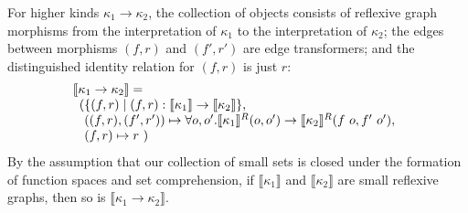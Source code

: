 \documentclass[preprint]{sigplanconf}
\newcommand{\sepbar}{\mathrel|}
\theoremstyle{examplestyle}
\newcommand{\sem}[1]{\llbracket #1 \rrbracket}
\newcommand{\semKR}[1]{\llbracket #1 \rrbracket^R}
\begin{document}
For higher kinds $\kappa_1 \to \kappa_2$, the collection of objects
consists of reflexive graph morphisms from the interpretation of
$\kappa_1$ to the interpretation of $\kappa_2$; the edges between
morphisms $(f, r)$ and $(f', r')$ are edge transformers; and the
distinguished identity relation for $(f,r)$ is just $r$:
\begin{displaymath}
  \begin{array}{@{}l}
    \sem{\kappa_1 \to \kappa_2} = \\
    \begin{array}[t]{l@{}l@{}}
      (& \{ (f,r) \sepbar (f, r) : \sem{\kappa_1} \to \sem{\kappa_2} \},\\
      &((f,r),(f',r')) \mapsto \forall o,o'. \semKR{\kappa_1}(o,o') \to \semKR{\kappa_2}(f~o, f'~o'), \\
      &(f,r) \mapsto r\ )
    \end{array}
  \end{array}
\end{displaymath}
By the assumption that our collection of small sets is closed under
the formation of function spaces and set comprehension, if
$\sem{\kappa_1}$ and $\sem{\kappa_2}$ are small reflexive graphs, then
so is $\sem{\kappa_1 \to \kappa_2}$.
\end{document}
